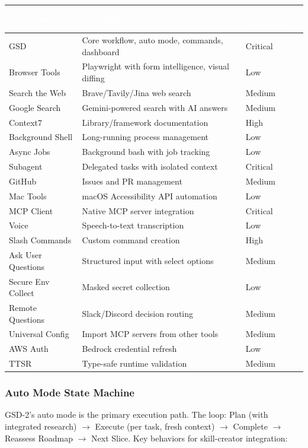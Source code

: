 \documentclass[11pt,letterpaper]{article}
\newcommand{\tableheader}[1]{\textbf{\sffamily\textcolor{white}{#1}}}
\begin{document}
\begin{center}
\begin{tabularx}{\textwidth}{L{3cm}XC{2cm}}
\toprule
{}
\tableheader{Extension} & \tableheader{Capability} & \tableheader{SC Relevance} \\
\midrule
GSD & Core workflow, auto mode, commands, dashboard & Critical \\
Browser Tools & Playwright with form intelligence, visual diffing & Low \\
Search the Web & Brave/Tavily/Jina web search & Medium \\
Google Search & Gemini-powered search with AI answers & Medium \\
Context7 & Library/framework documentation & High \\
Background Shell & Long-running process management & Low \\
Async Jobs & Background bash with job tracking & Low \\
Subagent & Delegated tasks with isolated context & Critical \\
GitHub & Issues and PR management & Medium \\
Mac Tools & macOS Accessibility API automation & Low \\
MCP Client & Native MCP server integration & Critical \\
Voice & Speech-to-text transcription & Low \\
Slash Commands & Custom command creation & High \\
Ask User Questions & Structured input with select options & Medium \\
Secure Env Collect & Masked secret collection & Low \\
Remote Questions & Slack/Discord decision routing & Medium \\
Universal Config & Import MCP servers from other tools & Medium \\
AWS Auth & Bedrock credential refresh & Low \\
TTSR & Type-safe runtime validation & Medium \\
\bottomrule
\end{tabularx}
\end{center}

\subsubsection{Auto Mode State Machine}

GSD-2's auto mode is the primary execution path. The loop: Plan (with integrated research) $\rightarrow$ Execute (per task, fresh context) $\rightarrow$ Complete $\rightarrow$ Reassess Roadmap $\rightarrow$ Next Slice. Key behaviors for skill-creator integration:
\end{document}
